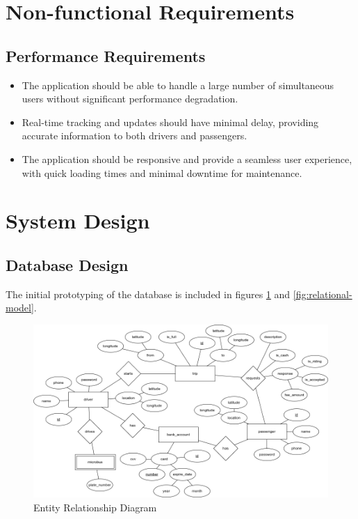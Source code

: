 \documentclass{BusMateSRS}
\begin{document}
\pagebreak

\section{Non-functional Requirements}
\subsection{Performance Requirements}
\begin{itemize}
	\item The application should be able to handle a large number of simultaneous
	      users without significant performance degradation.
	\item Real-time tracking and updates should have minimal delay,
	      providing accurate information to both drivers and passengers.
	\item The application should be responsive and provide a seamless user
	      experience, with quick loading times and minimal downtime for maintenance.
\end{itemize}


\section{System Design}

\subsection{Database Design}

The initial prototyping of the database is included in figures
\ref{fig:entity-relationship-diagram} and 
\ref{fig:relational-model}.

\begin{figure}[ht!]
	\begin{center}
		\includegraphics[width=\columnwidth]{drawings/entity-relationship-diagram.drawio.png}
	\end{center}
	\caption{Entity Relationship Diagram}
	\label{fig:entity-relationship-diagram}
\end{figure}
\end{document}
